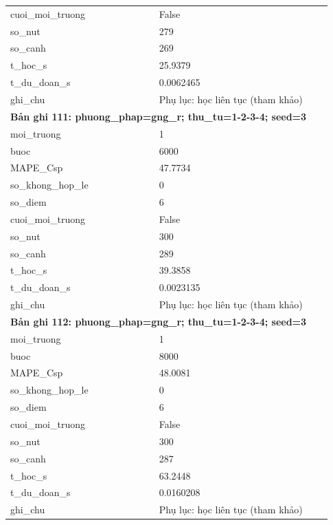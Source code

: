 \begin{longtable}{p{0.43\linewidth}p{0.50\linewidth}}
cuoi\_\allowbreak moi\_\allowbreak truong & False \\
so\_\allowbreak nut & 279 \\
so\_\allowbreak canh & 269 \\
t\_\allowbreak hoc\_\allowbreak s & 25.9379 \\
t\_\allowbreak du\_\allowbreak doan\_\allowbreak s & 0.0062465 \\
ghi\_\allowbreak chu & Phụ lục: học liên tục (tham khảo) \\
\midrule
\multicolumn{2}{p{0.95\linewidth}}{\textbf{Bản ghi 111: phuong\_phap=gng\_r; thu\_tu=1-2-3-4; seed=3}} \\
moi\_\allowbreak truong & 1 \\
buoc & 6000 \\
MAPE\_\allowbreak Csp & 47.7734 \\
so\_\allowbreak khong\_\allowbreak hop\_\allowbreak le & 0 \\
so\_\allowbreak diem & 6 \\
cuoi\_\allowbreak moi\_\allowbreak truong & False \\
so\_\allowbreak nut & 300 \\
so\_\allowbreak canh & 289 \\
t\_\allowbreak hoc\_\allowbreak s & 39.3858 \\
t\_\allowbreak du\_\allowbreak doan\_\allowbreak s & 0.0023135 \\
ghi\_\allowbreak chu & Phụ lục: học liên tục (tham khảo) \\
\midrule
\multicolumn{2}{p{0.95\linewidth}}{\textbf{Bản ghi 112: phuong\_phap=gng\_r; thu\_tu=1-2-3-4; seed=3}} \\
moi\_\allowbreak truong & 1 \\
buoc & 8000 \\
MAPE\_\allowbreak Csp & 48.0081 \\
so\_\allowbreak khong\_\allowbreak hop\_\allowbreak le & 0 \\
so\_\allowbreak diem & 6 \\
cuoi\_\allowbreak moi\_\allowbreak truong & False \\
so\_\allowbreak nut & 300 \\
so\_\allowbreak canh & 287 \\
t\_\allowbreak hoc\_\allowbreak s & 63.2448 \\
t\_\allowbreak du\_\allowbreak doan\_\allowbreak s & 0.0160208 \\
ghi\_\allowbreak chu & Phụ lục: học liên tục (tham khảo) \\

\end{longtable}
